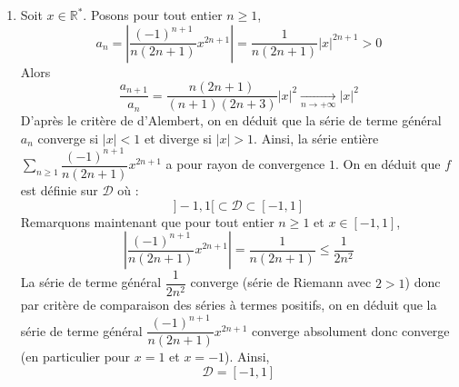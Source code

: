 \documentclass[a4paper,twoside,french,11pt]{VcCours}
\newcommand{\Sum}[2]{\sum_{#1}^{#2}}
\begin{document}
\begin{enumerate}
\item Soit $x \in \mathbb{R}^*$. Posons pour tout entier $n \geq 1$,
$$ a_n = \left\vert \dfrac{(-1)^{n+1}}{n(2n+1)} x^{2n+1} \right\vert = \dfrac{1}{n(2n+1)} \vert x \vert ^{2n+1} >0$$
Alors 
$$ \dfrac{a_{n+1}}{a_n} = \dfrac{n(2n+1)}{(n+1)(2n+3)} \vert x \vert^2 \underset{n \rightarrow + \infty}{\longrightarrow} \vert x \vert^2$$
D'après le critère de d'Alembert, on en déduit que la série de terme général $a_n$ converge si $\vert x \vert<1$ et diverge si $\vert x \vert >1$. Ainsi, la série entière $\Sum{n \geq 1}{} \dfrac{(-1)^{n+1}}{n(2n+1)} x^{2n+1}$ a pour rayon de convergence $1$. On en déduit que $f$ est définie sur $\mathcal{D}$ où :
$$ ]-1,1[ \subset \mathcal{D} \subset [-1,1]$$
Remarquons maintenant que pour tout entier $n \geq 1$ et $x \in [-1,1]$,
$$ \left\vert \dfrac{(-1)^{n+1}}{n(2n+1)} x^{2n+1} \right\vert= \dfrac{1}{n(2n+1)} \leq \dfrac{1}{2n^2}$$
La série de terme général $\dfrac{1}{2n^2}$ converge (série de Riemann avec $2>1$) donc par critère de comparaison des séries à termes positifs, on en déduit que la série de terme général $\dfrac{(-1)^{n+1}}{n(2n+1)} x^{2n+1}$ converge absolument donc converge (en particulier pour $x=1$ et $x=-1$). Ainsi,
$$ \mathcal{D}= [-1,1]$$


\end{enumerate}
\end{document}
